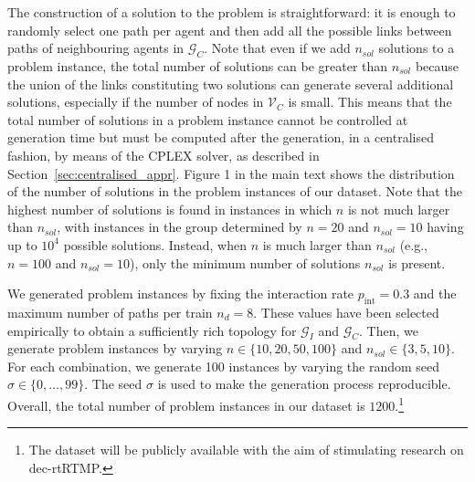 The construction of a solution to the problem is straightforward: it is enough to randomly select one path per agent and then add all the possible links between paths of neighbouring agents in $\mathcal{G}_C$. Note that even if we add $n_{sol}$ solutions to a problem instance, the total number of solutions can be greater than $n_{sol}$ because the union of the links constituting two solutions can generate several additional solutions, especially if the number of nodes in $\mathcal{V}_C$ is small. This means that the total number of solutions in a problem instance cannot be controlled at generation time but must be computed after the generation, in a centralised fashion, by means of the CPLEX solver, as described in Section~\ref{sec:centralised_appr}. Figure 1 in the main text shows the distribution of the number of solutions in the problem instances of our dataset.  Note that 
the highest number of solutions is found in instances in which $n$ is not much larger than $n_{sol}$, with instances in the group determined by $n=20$ and $n_{sol}=10$ having up to $10^4$ possible solutions. Instead, when $n$ is much larger than $n_{sol}$ (e.g., $n=100$ and $n_{sol}=10$), only the minimum number of solutions $n_{sol}$ is present.

We generated problem instances by fixing the interaction rate $p_{\operatorname{int}}=0.3$ and the maximum number of paths per train $n_d=8$. These values have been selected empirically to obtain a sufficiently rich topology for $\mathcal{G}_I$ and $\mathcal{G}_C$. Then, we generate problem instances by varying $n \in \{10, 20, 50, 100\}$ and $n_{sol}\in\{3, 5, 10\}$. For each combination, we generate 100 instances by varying the random seed $\sigma\in\{0,\ldots,99\}$. The seed $\sigma$ is  used to make the generation process reproducible. Overall, the total number of problem instances in our dataset is $1200$.\footnote{The dataset will be publicly available with the aim of stimulating research on dec-rtRTMP.}

